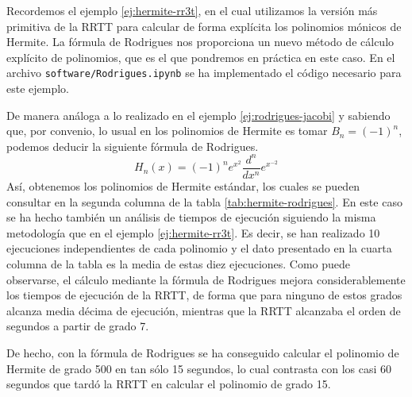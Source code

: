 \begin{ejemplo}
    Recordemos el ejemplo \ref{ej:hermite-rr3t}, en el cual utilizamos la versión más primitiva de la RRTT para calcular de forma explícita los polinomios mónicos de Hermite. La fórmula de Rodrigues nos proporciona un nuevo método de cálculo explícito de polinomios, que es el que pondremos en práctica en este caso. En el archivo \texttt{software/Rodrigues.ipynb} se ha implementado el código necesario para este ejemplo.

    De manera análoga a lo realizado en el ejemplo \ref{ej:rodrigues-jacobi} y sabiendo que, por convenio, lo usual en los polinomios de Hermite es tomar $B_n=(-1)^n$, podemos deducir la siguiente fórmula de Rodrigues. 
    $$
    H_n(x)=(-1)^n e^{x^2}\frac{d^n}{dx^n}e^{x^{-2}}
    $$
    Así, obtenemos los polinomios de Hermite estándar, los cuales se pueden consultar en la segunda columna de la tabla \ref{tab:hermite-rodrigues}. En este caso se ha hecho también un análisis de tiempos de ejecución siguiendo la misma metodología que en el ejemplo \ref{ej:hermite-rr3t}. Es decir, se han realizado 10 ejecuciones independientes de cada polinomio y el dato presentado en la cuarta columna de la tabla es la media de estas diez ejecuciones. Como puede observarse, el cálculo mediante la fórmula de Rodrigues mejora considerablemente los tiempos de ejecución de la RRTT, de forma que para ninguno de estos grados alcanza media décima de ejecución, mientras que la RRTT alcanzaba el orden de segundos a partir de grado 7.

    De hecho, con la fórmula de Rodrigues se ha conseguido calcular el polinomio de Hermite de grado 500 en tan sólo 15 segundos, lo cual contrasta con los casi 60 segundos que tardó la RRTT en calcular el polinomio de grado 15.


\end{ejemplo}
